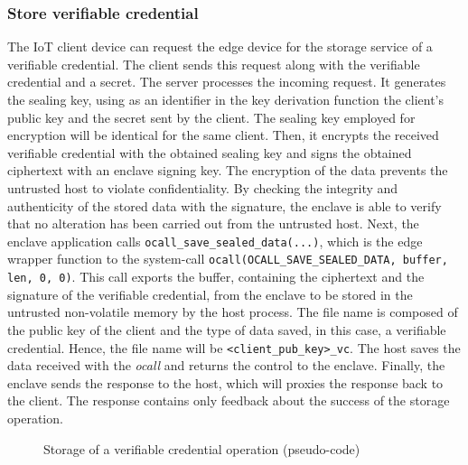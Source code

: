 \subsubsection{Store verifiable credential}
The IoT client device can request the edge device for the storage service of a verifiable credential.
The client sends this request along with the verifiable credential and a secret. The server processes the incoming request. It generates the sealing key, using as an identifier in the key derivation function the client's public key and the secret sent by the client. The sealing key employed for encryption will be identical for the same client. Then, it encrypts the received verifiable credential with the obtained sealing key and signs the obtained ciphertext with an enclave signing key. 
The encryption of the data prevents the untrusted host to violate confidentiality. By checking the integrity and authenticity of the stored data with the signature, the enclave is able to verify that no alteration has been carried out from the untrusted host.
Next, the enclave application calls \texttt{ocall\_save\_sealed\_data(...)}, which is the edge wrapper function to the system-call \texttt{ocall(OCALL\_SAVE\_SEALED\_DATA, buffer, len, 0, 0)}. This call exports the buffer, containing the ciphertext and the signature of the verifiable credential, from the enclave to be stored in the untrusted non-volatile memory by the host process. The file name is composed of the public key of the client and the type of data saved, in this case, a verifiable credential. Hence, the file name will be \texttt{<client\_pub\_key>\_vc}. 
The host saves the data received with the \textit{ocall} and returns the control to the enclave.  
Finally, the enclave sends the response to the host, which will proxies the response back to the client. The response contains only feedback about the success of the storage operation. \\

\begin{figure}[H]
    \centering
    
    \caption{Storage of a verifiable credential operation (pseudo-code)}
    \label{poc-store-vc}
\end{figure}


